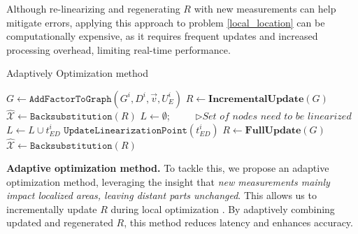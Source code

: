Although re-linearizing and regenerating \( R \) with new measurements can help mitigate errors, applying this approach to problem \eqref{local_location} can be computationally expensive, as it requires frequent updates and increased processing overhead, limiting real-time performance.



\begin{algorithm}

\caption{Adaptively Optimization method}
\setlength{\abovedisplayskip}{3pt}
\setlength{\belowdisplayskip}{-1cm}
\label{algorithm}
$G \leftarrow \mathtt{AddFactorToGraph}(G^i, D^i, \vec{v}, U^i_E)$\;
$R \leftarrow \mathtt{\textbf{IncrementalUpdate}}(G)$\;
$\hat{\mathcal{X}} \leftarrow \mathtt{Backsubstitution}(R)$\;
$L \leftarrow \emptyset$;  $\quad\quad \triangleright \textit{Set of nodes need to be linearized}$\;
{
{$L \leftarrow L \cup t^i_{ED}$\;}
}
{
{
$\mathtt{UpdateLinearizationPoint}(t^i_{ED})$\;
}
$R \leftarrow \mathtt{\textbf{FullUpdate}}(G)$\;
$\hat{\mathcal{X}} \leftarrow \mathtt{Backsubstitution}(R)$\;
}
\end{algorithm}


\vspace{-0.2cm}
\textbf{Adaptive optimization method.}
To tackle this, we propose an adaptive optimization method, leveraging the insight that \textit{new measurements mainly impact localized areas, leaving distant parts unchanged}. 
This allows us to incrementally update $R$ during local optimization \cite{kaess2012isam2}. 
By adaptively combining updated and regenerated $R$, this method reduces latency and enhances accuracy.

